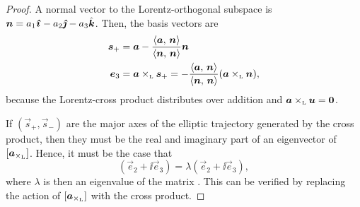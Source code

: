\begin{proof}
    A normal vector to the Lorentz-orthogonal subspace is 
    \(\vec{n} = a_1\quati - a_2\quatj - a_3\quatk\). 
    Then, the basis vectors are
    \begin{equation}
        \begin{split}
            \vec{s}_+ &= \vec{a} - \frac{ \inner{\vec{a}}{\vec{n}} }{ \inner{\vec{n}}{\vec{n}} } \vec{n} \\
            \vec{e}_3 &= \lorcrossp{\vec{a}}{\vec{s}_+} = -\frac{ \inner{\vec{a}}{\vec{n}} }{ \inner{\vec{n}}{\vec{n}} } \qty(\lorcrossp{\vec{a}}{\vec{n}}),
        \end{split}
    \end{equation}
    because the Lorentz-cross product distributes over addition and \(\lorcrossp{\vec{a}}{\vec{u}} = \mathbf{0}\). 

    If \((\vec{s}_+, \vec{s}_-)\) are the major axes of the elliptic trajectory generated by the cross product, then they must be the real and imaginary part of an eigenvector of \([\vec{a}_{\lorcrossp{}{}}]\). Hence, it must be the case that 
    \begin{equation}
     [\vec{a}_{\lorcrossp{}{}}](\vec{e}_2 + \ii\vec{e}_3) = \lambda(\vec{e}_2 + \ii\vec{e}_3),
\end{equation} 
    where \(\lambda\) is then an eigenvalue of the matrix \cite{Edwards2018}. This can be verified by replacing the action of \([\vec{a}_{\lorcrossp{}{}}]\) with the cross product. 
    

\end{proof}
